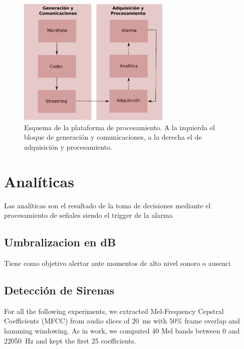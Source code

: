 \documentclass{article}
\begin{document}
\begin{figure}[h]
\begin{center}
\includegraphics[width=0.65\textwidth]{plataforma_procesamiento} 
\caption{Esquema de la plataforma de procesamiento. A la izquierda el bloque de generación y comunicaciones, a la derecha el de adquisición y procesamiento.}
\label{fig:plataforma_procesamiento}
\end{center}
\end{figure}

\section{Analíticas}

Las analíticas son el resultado de la toma de decisiones mediante el procesamiento de señales siendo el trigger de la alarma

\subsection{Umbralizacion en dB}
Tiene como objetivo alertar ante momentos de alto nivel sonoro o ausenci

\subsection{Detección de Sirenas}
For all the following experiments, we extracted Mel-Frequency Cepstral Coefficients (MFCC) from audio slices of \SI{20}{\milli\second} with 50\% frame overlap and hamming windowing. As in  work, we computed 40 Mel bands between 0 and \SI{22050}{\Hz} and kept the first 25 coefficients. 
\end{document}
